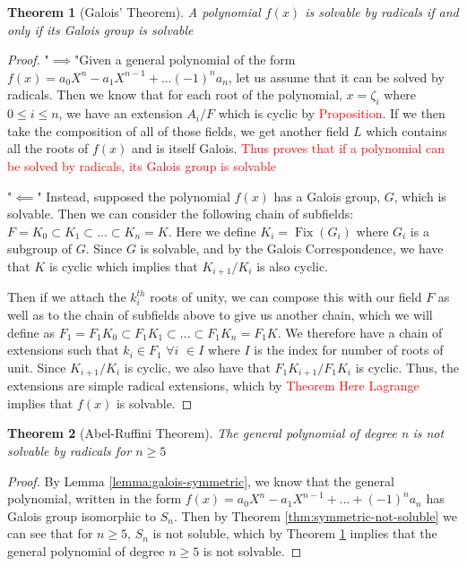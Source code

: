 \documentclass[12pt]{article}
\newtheorem{theorem}{Theorem}
\theoremstyle{definition}
\newcommand{\Fix}{\operatorname{Fix}}
\begin{document}
\begin{theorem}[Galois' Theorem]\label{thm:galois-theorem}
     A polynomial $f(x)$ is solvable by radicals if and only if its Galois group is solvable
\end{theorem}

\begin{proof}
    "$\implies $"Given a general polynomial of the form $f(x) = a_0X^n - a_1X^{n-1}+...(-1)^na_n$, let us assume that it can be solved by radicals. Then we know that for each root of the polynomial, $x=\zeta_i$ where $0\leq i \leq n$, we have an extension $A_i/F$ which is cyclic by \textcolor{red}{Proposition}. If we then take the composition of all of those fields, we get another field $L$ which contains all the roots of $f(x)$ and is itself Galois. 
    \textcolor{red}{Thus proves that if a polynomial can be solved by radicals, its Galois group is solvable}

    "$\impliedby$" Instead, supposed the polynomial $f(x)$ has a Galois group, $G$, which is solvable. Then we can consider the following chain of subfields: $F=K_0\subset K_1 \subset ... \subset K_n = K$. Here we define $K_i = \Fix(G_i)$ where $G_i$ is a subgroup of $G$.
    Since $G$ is solvable, and by the Galois Correspondence, we have that $K$ is cyclic which implies that $K_{i+1}/K_i$ is also cyclic.

    Then if we attach the $k_i^{th}$ roots of unity, we can compose this with our field $F$ as well as to the chain of subfields above to give us another chain, which we will define as $F_1 = F_1K_0 \subset F_1K_1 \subset ... \subset F_1K_n = F_1K$. We therefore have a chain of extensions such that $k_i \in F_1$ $\forall i$ \hspace{0.1cm} $\in I$ where $I$ is the index for number of roots of unit. Since $K_{i+1}/K_i$ is cyclic, we also have that $F_1K_{i+1}/F_1K_i$ is cyclic. Thus, the extensions are simple radical extensions, which by \textcolor{red}{Theorem Here Lagrange} implies that $f(x)$ is solvable.
\end{proof}

\begin{theorem}[Abel-Ruffini Theorem]\label{thm:abel-ruffini-thm}
    The general polynomial of degree n is not solvable by radicals for $n \ge 5$
\end{theorem}

\begin{proof}
    By Lemma \ref{lemma:galois-symmetric}, we know that the general polynomial, written in the form $f(x)=a_0X^n - a_1X^{n-1} + ... + (-1)^na_n$ has Galois group isomorphic to $S_n$. Then by Theorem \ref{thm:symmetric-not-soluble} we can see that for $n \geq 5$, $S_n$ is not soluble, which by Theorem \ref{thm:galois-theorem} implies that the general polynomial of degree $n \geq 5$ is not solvable.
\end{proof}
\end{document}
